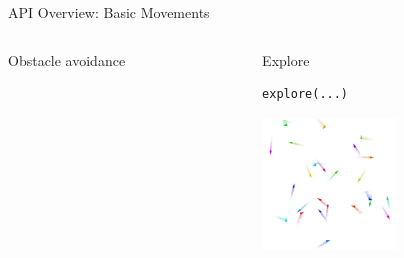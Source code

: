 \documentclass[presentation, 9pt]{beamer}\mode<presentation>{\usetheme{AMSBolognaFC}}
\begin{document}
\begin{frame}[fragile]{API Overview: Basic Movements}
\begin{columns}
\begin{column}[t]{0.3\textwidth}
\begin{exampleblock}{Obstacle avoidance}
		\end{exampleblock}
	\end{column}
	\begin{column}[t]{0.3\textwidth}
		\begin{exampleblock}{Explore}
		\begin{verbatim}
explore(...)
		\end{verbatim}
		\includegraphics[height=3.5cm]{img/explore-2.png}
		\end{exampleblock}
	\end{column}
\end{columns}
\end{frame}
\end{document}
